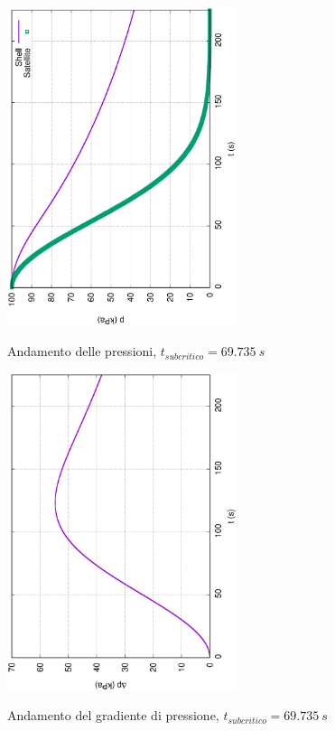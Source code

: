 \documentclass{article}
\begin{document}
        \begin{figure}[h!]
            \centering
            \includegraphics[width=0.6\textwidth, angle=-90]{MUL2/Esercitazione1/2C/p.eps}
            \label{fig:press_10_7} 
            \caption{Andamento delle pressioni, $t_{subcritico} = 69.735  \ s$}
        \end{figure}
        
        \begin{figure}[h!] 
            \centering
            \includegraphics[width=0.6\textwidth, angle=-90]{MUL2/Esercitazione1/2C/Dp.eps}
            \label{fig:grad_press_10_7}
            \caption{Andamento del gradiente di pressione, $t_{subcritico} = 69.735  \ s$}
        \end{figure}
\end{document}
